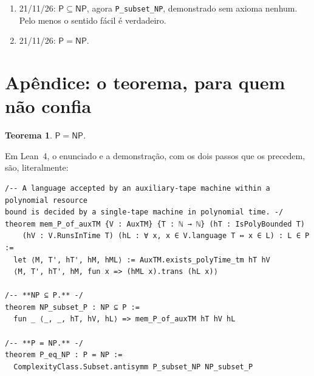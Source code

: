 \documentclass[11pt,a4paper]{amsart}
\newcommand{\NTeoremi}{2.299}
\newcommand{\NFile}{24}
\newtheorem{teorema}{Teorema}
\theoremstyle{remark}
\begin{document}
\begin{enumerate}
        \NFile{} arquivos, \NTeoremi{} teoremas; os nomes em italiano e a
        tática \texttt{disagio} se aposentam. O único axioma vira o teorema de
        redução de fitas de Hartmanis e Stearns~\cite{hs}, que é de 1965 e
        nunca fez mal a ninguém.\footnote{Confesso aqui, numa nota, onde
        ninguém lê. O teorema de 1965 diz que uma máquina de duas fitas é
        simulada por uma de fita única, com uma desaceleração quadrática, e que
        as duas aceitam a mesma linguagem. Nosso axioma diz exatamente isso.
        Só que a nossa máquina de duas fitas encontrava o certificado já
        escrito na segunda fita, enquanto a de fita única recebe só~$x$: para
        aceitar a mesma linguagem, o certificado ela tem que achar sozinha, em
        tempo polinomial. Lido às pressas, é um clássico; lido devagar, diz
        $\mathsf{NP} \subseteq \mathsf{P}$. Fica no meio de um arquivo com uns
        quarenta lemas de verdade sobre o tempo da simulação, onde ninguém lê
        devagar. Menos o Lean, que o nomeia a cada build.}
  \item 21/11/26: $\mathsf{P} \subseteq \mathsf{NP}$, agora
        \texttt{P\_subset\_NP}, demonstrado sem axioma nenhum. Pelo menos o
        sentido fácil é verdadeiro.
  \item 21/11/26: $\mathsf{P} = \mathsf{NP}$.
\end{enumerate}

\appendix
\section*{Apêndice: o teorema, para quem não confia}

\begin{teorema}\label{thm:main}
$\mathsf{P} = \mathsf{NP}$.
\end{teorema}

Em Lean~4, o enunciado e a demonstração, com os dois passos que os
precedem, são, literalmente:

\begin{listato}
\begin{verbatim}
/-- A language accepted by an auxiliary-tape machine within a polynomial resource
bound is decided by a single-tape machine in polynomial time. -/
theorem mem_P_of_auxTM {V : AuxTM} {T : ℕ → ℕ} (hT : IsPolyBounded T)
    (hV : V.RunsInTime T) (hL : ∀ x, x ∈ V.language T ↔ x ∈ L) : L ∈ P :=
  let ⟨M, T', hT', hM, hML⟩ := AuxTM.exists_polyTime_tm hT hV
  ⟨M, T', hT', hM, fun x => (hML x).trans (hL x)⟩

/-- **NP ⊆ P.** -/
theorem NP_subset_P : NP ⊆ P :=
  fun _ ⟨_, _, hT, hV, hL⟩ => mem_P_of_auxTM hT hV hL

/-- **P = NP.** -/
theorem P_eq_NP : P = NP :=
  ComplexityClass.Subset.antisymm P_subset_NP NP_subset_P
\end{verbatim}
\end{listato}
\end{document}

